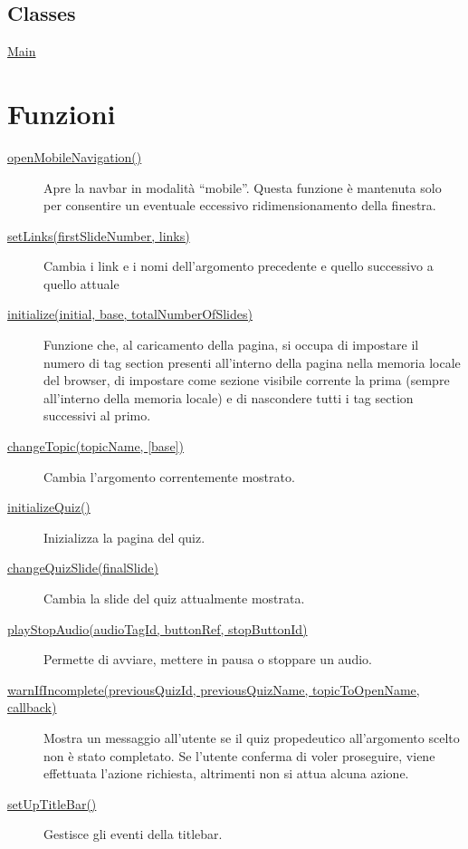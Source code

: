 \hypertarget{classes}{%
\subsection{Classes}\label{classes}}

\begin{description}
\item[{ \protect\hyperlink{Main}{Main} }]
\end{description}

\hypertarget{functions}{%
\section{Funzioni}\label{functions}}

\begin{description}
\item[{ \protect\hyperlink{openMobileNavigation}{openMobileNavigation()}
}]
Apre la navbar in modalità ``mobile''. Questa funzione è mantenuta solo
per consentire un eventuale eccessivo ridimensionamento della finestra.
\item[{ \protect\hyperlink{setLinks}{setLinks(firstSlideNumber, links)}
}]
Cambia i link e i nomi dell'argomento precedente e quello successivo a
quello attuale
\item[{ \protect\hyperlink{initialize}{initialize(initial, base,
totalNumberOfSlides)} }]
Funzione che, al caricamento della pagina, si occupa di impostare il
numero di tag section presenti all'interno della pagina nella memoria
locale del browser, di impostare come sezione visibile corrente la prima
(sempre all'interno della memoria locale) e di nascondere tutti i tag
section successivi al primo.
\item[{ \protect\hyperlink{changeTopic}{changeTopic(topicName,
{[}base{]})} }]
Cambia l'argomento correntemente mostrato.
\item[{ \protect\hyperlink{initializeQuiz}{initializeQuiz()} }]
Inizializza la pagina del quiz.
\item[{ \protect\hyperlink{changeQuizSlide}{changeQuizSlide(finalSlide)}
}]
Cambia la slide del quiz attualmente mostrata.
\item[{ \protect\hyperlink{playStopAudio}{playStopAudio(audioTagId,
buttonRef, stopButtonId)} }]
Permette di avviare, mettere in pausa o stoppare un audio.
\item[{
\protect\hyperlink{warnIfIncomplete}{warnIfIncomplete(previousQuizId,
previousQuizName, topicToOpenName, callback)} }]
Mostra un messaggio all'utente se il quiz propedeutico all'argomento
scelto non è stato completato. Se l'utente conferma di voler proseguire,
viene effettuata l'azione richiesta, altrimenti non si attua alcuna
azione.
\item[{ \protect\hyperlink{setUpTitleBar}{setUpTitleBar()} }]
Gestisce gli eventi della titlebar.


\end{description}
